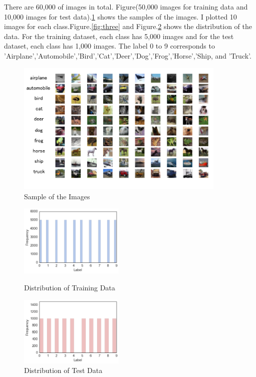 \documentclass[a4paper,10pt,fleqn]{article}
\begin{document}
There are 60,000 of images in total. Figure(50,000 images for training data and 10,000 images for test data).\ref{fig:two} shows the samples of the images. I plotted 10 images for each class.Figure.\ref{fig:three} and Figure.\ref{fig:four} shows the distribution of the data. For the training dataset, each class has 5,000 images and for the test dataset, each class has 1,000 images.
The label 0 to 9 corresponds to 'Airplane','Automobile','Bird','Cat','Deer','Dog','Frog','Horse','Ship, and 'Truck'.
\begin{figure}[htbp]

\begin{center}
\includegraphics[width=10cm]{picture/random_sample.png}
\end{center}
\caption{Sample of the Images}
\label{fig:two}

\end{figure}

\begin{figure}[h]
\begin{minipage}{0.5\hsize}
	\begin{center}
	\includegraphics[width=5cm]{picture/Distribution_of_Training_Data.png}
	\end{center}
	\caption{Distribution of Training Data}
	\label{fig:three}
\end{minipage}
\begin{minipage}{0.5\hsize}
\begin{center}
\includegraphics[width=5cm]{picture/Distribution_of_Test_Data.png}
\end{center}
 \caption{Distribution of Test Data}
  \label{fig:four}
 \end{minipage}
\end{figure}
\end{document}

